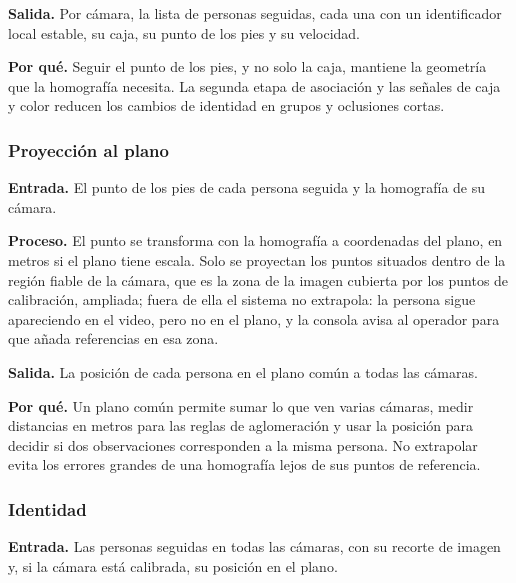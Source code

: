 \textbf{Salida.} Por cámara, la lista de personas seguidas, cada una con un identificador local
estable, su caja, su punto de los pies y su velocidad.

\textbf{Por qué.} Seguir el punto de los pies, y no solo la caja, mantiene la geometría que la
homografía necesita. La segunda etapa de asociación y las señales de caja y color reducen los
cambios de identidad en grupos y oclusiones cortas.

\subsubsection{Proyección al plano}
\label{subsec:met-proyeccion}

\textbf{Entrada.} El punto de los pies de cada persona seguida y la homografía de su cámara.

\textbf{Proceso.} El punto se transforma con la homografía a coordenadas del plano, en metros
si el plano tiene escala. Solo se proyectan los puntos situados dentro de la región fiable de la
cámara, que es la zona de la imagen cubierta por los puntos de calibración, ampliada; fuera de
ella el sistema no extrapola: la persona sigue apareciendo en el video, pero no en el plano, y la
consola avisa al operador para que añada referencias en esa zona.

\textbf{Salida.} La posición de cada persona en el plano común a todas las cámaras.

\textbf{Por qué.} Un plano común permite sumar lo que ven varias cámaras, medir distancias en
metros para las reglas de aglomeración y usar la posición para decidir si dos observaciones
corresponden a la misma persona. No extrapolar evita los errores grandes de una homografía
lejos de sus puntos de referencia.

\subsubsection{Identidad}
\label{subsec:met-identidad}

\textbf{Entrada.} Las personas seguidas en todas las cámaras, con su recorte de imagen y, si la
cámara está calibrada, su posición en el plano.

